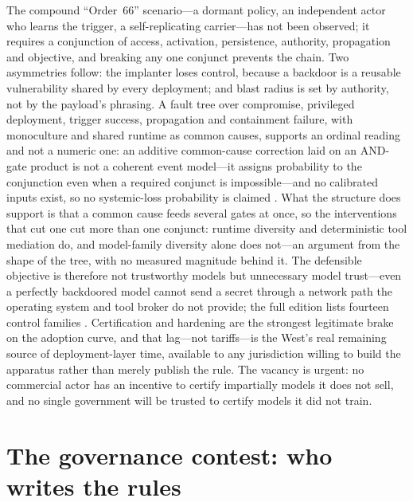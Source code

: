 The compound ``Order~66'' scenario---a dormant policy, an independent actor who learns the trigger, a self-replicating carrier---has not been observed; it requires a conjunction of access, activation, persistence, authority, propagation and objective, and breaking any one conjunct prevents the chain. Two asymmetries follow: the implanter loses control, because a backdoor is a reusable vulnerability shared by every deployment; and blast radius is set by authority, not by the payload's phrasing. A fault tree over compromise, privileged deployment, trigger success, propagation and containment failure, with monoculture and shared runtime as common causes, supports an ordinal reading and not a numeric one: an additive common-cause correction laid on an AND-gate product is not a coherent event model---it assigns probability to the conjunction even when a required conjunct is impossible---and no calibrated inputs exist, so no systemic-loss probability is claimed . What the structure does support is that a common cause feeds several gates at once, so the interventions that cut one cut more than one conjunct: runtime diversity and deterministic tool mediation do, and model-family diversity alone does not---an argument from the shape of the tree, with no measured magnitude behind it. The defensible objective is therefore not trustworthy models but unnecessary model trust---even a perfectly backdoored model cannot send a secret through a network path the operating system and tool broker do not provide; the full edition lists fourteen control families . Certification and hardening are the strongest legitimate brake on the adoption curve, and that lag---not tariffs---is the West's real remaining source of deployment-layer time, available to any jurisdiction willing to build the apparatus rather than merely publish the rule. The vacancy is urgent: no commercial actor has an incentive to certify impartially models it does not sell, and no single government will be trusted to certify models it did not train.

\section{The governance contest: who writes the rules}

